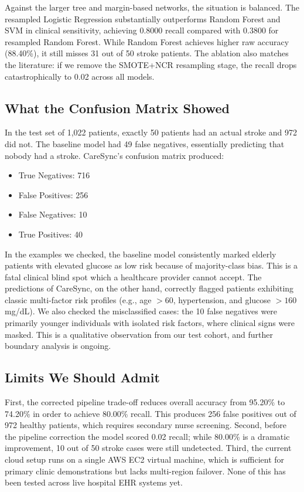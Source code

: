 \documentclass[10pt,journal,compsoc]{IEEEtran}
\begin{document}
Against the larger tree and margin-based networks, the situation is balanced. The resampled Logistic Regression substantially outperforms Random Forest and SVM in clinical sensitivity, achieving 0.8000 recall compared with 0.3800 for resampled Random Forest. While Random Forest achieves higher raw accuracy (88.40\%), it still misses 31 out of 50 stroke patients. The ablation also matches the literature: if we remove the SMOTE+NCR resampling stage, the recall drops catastrophically to 0.02 across all models.

\subsection{What the Confusion Matrix Showed}
In the test set of 1,022 patients, exactly 50 patients had an actual stroke and 972 did not. The baseline model had 49 false negatives, essentially predicting that nobody had a stroke. CareSync's confusion matrix produced:
\begin{itemize}
    \item True Negatives: 716
    \item False Positives: 256
    \item False Negatives: 10
    \item True Positives: 40
\end{itemize}
In the examples we checked, the baseline model consistently marked elderly patients with elevated glucose as low risk because of majority-class bias. This is a fatal clinical blind spot which a healthcare provider cannot accept. The predictions of CareSync, on the other hand, correctly flagged patients exhibiting classic multi-factor risk profiles (e.g., age $>60$, hypertension, and glucose $>160$\,mg/dL). We also checked the misclassified cases: the 10 false negatives were primarily younger individuals with isolated risk factors, where clinical signs were masked. This is a qualitative observation from our test cohort, and further boundary analysis is ongoing.

\subsection{Limits We Should Admit}
First, the corrected pipeline trade-off reduces overall accuracy from 95.20\% to 74.20\% in order to achieve 80.00\% recall. This produces 256 false positives out of 972 healthy patients, which requires secondary nurse screening. Second, before the pipeline correction the model scored 0.02 recall; while 80.00\% is a dramatic improvement, 10 out of 50 stroke cases were still undetected. Third, the current cloud setup runs on a single AWS EC2 virtual machine, which is sufficient for primary clinic demonstrations but lacks multi-region failover. None of this has been tested across live hospital EHR systems yet.
\end{document}
